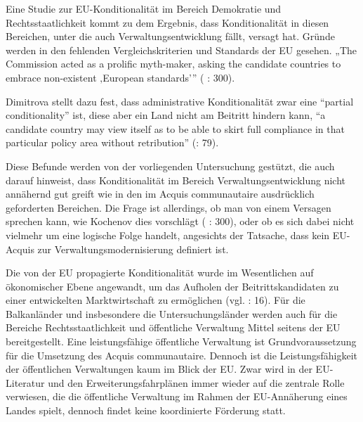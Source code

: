 Eine Studie zur EU-Konditionalität im Bereich Demokratie und Rechtsstaatlichkeit kommt zu dem Ergebnis, dass Konditionalität in diesen Bereichen, unter die auch Verwaltungsentwicklung fällt, versagt hat. Gründe werden in den fehlenden Vergleichskriterien und Standards der EU gesehen. „The Commission acted as a prolific myth-maker, asking the candidate countries to embrace non-existent ‚European standards’” (\cite{kochenov} : 300).\par
Dimitrova stellt dazu fest, dass administrative Konditionalität zwar eine “partial conditionality” ist, diese aber ein Land nicht am Beitritt hindern kann, “a candidate country may view itself as to be able to skirt full compliance in that particular policy area without retribution” (\cite{dimit05}: 79). \par
Diese Befunde werden von der vorliegenden Untersuchung gestützt, die auch darauf hinweist, dass Konditionalität im Bereich Verwaltungsentwicklung nicht annähernd gut greift wie in den im Acquis communautaire ausdrücklich geforderten Bereichen. Die Frage ist allerdings, ob man von einem Versagen sprechen kann, wie Kochenov dies vorschlägt (\cite{kochenov} : 300), oder ob es sich dabei nicht vielmehr um eine logische Folge handelt, angesichts der Tatsache, dass kein EU-Acquis zur Verwaltungsmodernisierung definiert ist.\par
Die von der EU propagierte Konditionalität wurde im Wesentlichen auf ökonomischer Ebene angewandt, um das Aufholen der Beitrittskandidaten zu einer entwickelten Marktwirtschaft zu ermöglichen (vgl. \cite{hugsas} : 16). Für die Balkanländer und insbesondere die Untersuchungsländer werden auch für die Bereiche Rechtsstaatlichkeit und öffentliche Verwaltung Mittel seitens der EU bereitgestellt. Eine leistungsfähige öffentliche Verwaltung ist Grundvoraussetzung für die Umsetzung des Acquis communautaire. Dennoch ist die Leistungsfähigkeit der öffentlichen Verwaltungen kaum im Blick der EU. Zwar wird in der EU-Literatur und den Erweiterungsfahrplänen immer wieder auf die zentrale Rolle verwiesen, die die öffentliche Verwaltung im Rahmen der EU-Annäherung eines Landes spielt, dennoch findet keine koordinierte Förderung statt. \par

